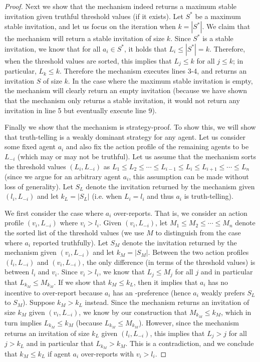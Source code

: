\begin{proof}
	Next we show that the mechanism indeed returns a maximum stable invitation given truthful threshold values (if it exists). Let $S^*$ be a maximum stable invitation, and let us focus on the iteration when $k = |S^*|$. We claim that the mechanism will return a stable invitation of size $k$.  Since $S^*$ is a stable invitation, we know that for all $a_i\in S^*$, it holds that $L_i \leq |S^*| = k$. Therefore, when the threshold values are sorted, this implies that $L_j \leq k$ for all $j\leq k$; in particular, $L_k \leq k$. Therefore the mechanism executes lines 3-4, and returns an invitation $S$ of size $k$.  In the case where the maximum stable invitation is empty, the mechanism will clearly return an empty invitation (because we have shown that the mechanism only returns a stable invitation, it would not return any invitation in line 5 but eventually execute line 9). 

	Finally we show that the mechanism is strategy-proof. To show this, we will show that truth-telling is a weakly dominant strategy for any agent. 
	Let us consider some fixed agent $a_i$ and also fix the action profile of the remaining agents to be $L_{-i}$ (which may or may not be truthful).
	Let us assume that the mechanism sorts the threshold values $(L_i, L_{-i})$ as $L_1 \leq L_2 \leq \cdots \leq L_{i-1} \leq L_i \leq L_{i+1} \leq \cdots \leq L_n$ (since we argue for an arbitrary agent $a_i$, this assumption can be made without loss of generality).
	Let $S_L$ denote the invitation returned by the mechanism given $(l_i, L_{-i})$ and let $k_L = |S_L|$ (i.e. when $L_i = l_i$ and thus $a_i$ is truth-telling). 

	We first consider the case where $a_i$ over-reports.  That is, we consider an action profile $(v_i, L_{-i})$ where $v_i > l_i$. Given $(v_i, L_{-i})$, let $M_1 \leq M_2 \leq \cdots \leq M_{n}$ denote the sorted list of the threshold values (we use $M$ to distinguish from the case where $a_i$ reported truthfully). Let $S_M$ denote the invitation returned by the mechanism given $(v_i, L_{-i})$ and let $k_M = |S_M|$. Between the two action profiles $(l_i, L_{-i})$ and $(v_i, L_{-i})$, the only difference (in terms of the threshold values) is between $l_i$ and $v_i$. Since $v_i > l_i$, we know that $L_j \leq M_j$ for all $j$ and in particular that $L_{k_M} \leq M_{k_M}$. If we show that $k_M \leq k_L$, then it implies that $a_i$ has no incentive to over-report because $a_i$ has an \INC-preference (hence $a_i$ weakly prefers $S_L$ to $S_M$). Suppose $k_M > k_L$ instead. Since the mechanism returns an invitation of size $k_M$ given $(v_i, L_{-i})$, we know by our construction that $M_{k_M} \leq k_M$, which in turn implies $L_{k_M} \leq k_M$ (because $L_{k_M} \leq M_{k_M}$). However, since the mechanism returns an invitation of size $k_L$ given $(l_i, L_{-i})$, this implies that $L_j > j$ for all $j > k_L$ and in particular that $L_{k_M} > k_M$.  This is a contradiction, and we conclude that $k_M \leq k_L$ if agent $a_i$ over-reports with $v_i > l_i$. 


\end{proof}
